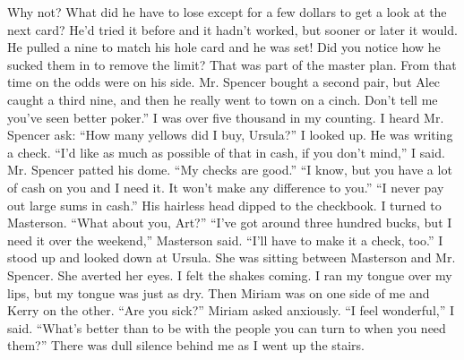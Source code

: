 \documentclass{novel}
\begin{document}
Why not? What did he have to lose except for a few dollars to get a look at the next card? He’d tried it before and it hadn’t worked, but sooner or later it would. He pulled a nine to match his hole card and he was set! Did you notice how he sucked them in to remove the limit? That was part of the master plan. From that time on the odds were on his side. Mr. Spencer bought a second pair, but Alec caught a third nine, and then he really went to town on a cinch. Don’t tell me you’ve seen better poker.” I was over five thousand in my counting. I heard Mr. Spencer ask: “How many yellows did I buy, Ursula?” I looked up. He was writing a check. “I’d like as much as possible of that in cash, if you don’t mind,” I said. Mr. Spencer patted his dome. “My checks are good.” “I know, but you have a lot of cash on you and I need it. It won’t make any difference to you.” “I never pay out large sums in cash.” His hairless head dipped to the checkbook. I turned to Masterson. “What about you, Art?” “I’ve got around three hundred bucks, but I need it over the weekend,” Masterson said. “I’ll have to make it a check, too.” I stood up and looked down at Ursula. She was sitting between Masterson and Mr. Spencer. She averted her eyes. I felt the shakes coming. I ran my tongue over my lips, but my tongue was just as dry. Then Miriam was on one side of me and Kerry on the other. “Are you sick?” Miriam asked anxiously. “I feel wonderful,” I said. “What’s better than to be with the people you can turn to when you need them?” There was dull silence behind me as I went up the stairs.


\begin{ChapterStart}

\vspace{3\nbs}
\end{ChapterStart}

\end{document}

